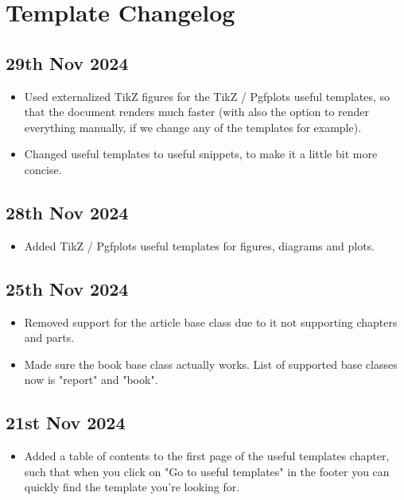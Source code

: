 \chapter*{Template Changelog}

\section*{29th Nov 2024} \label{sec:changelog:2024/11/29}
\begin{itemize}
    \item Used externalized TikZ figures for the TikZ / Pgfplots useful templates, so that the document renders much faster (with also the option to render everything manually, if we change any of the templates for example).
    \item Changed useful templates to useful snippets, to make it a little bit more concise.
\end{itemize}

\section*{28th Nov 2024} \label{sec:changelog:2024/11/28}
\begin{itemize}
    \item Added TikZ / Pgfplots useful templates for figures, diagrams and plots.
\end{itemize}

\section*{25th Nov 2024} \label{sec:changelog:2024/11/25}
\begin{itemize}
    \item Removed support for the article base class due to it not supporting chapters and parts.
    \item Made sure the book base class actually works. List of supported base classes now is "report" and "book".
\end{itemize}

\section*{21st Nov 2024} \label{sec:changelog:2024/11/21}
\begin{itemize}
    \item Added a table of contents to the first page of the useful templates chapter, such that when you click on "Go to useful templates" in the footer you can quickly find the template you're looking for.
\end{itemize}

